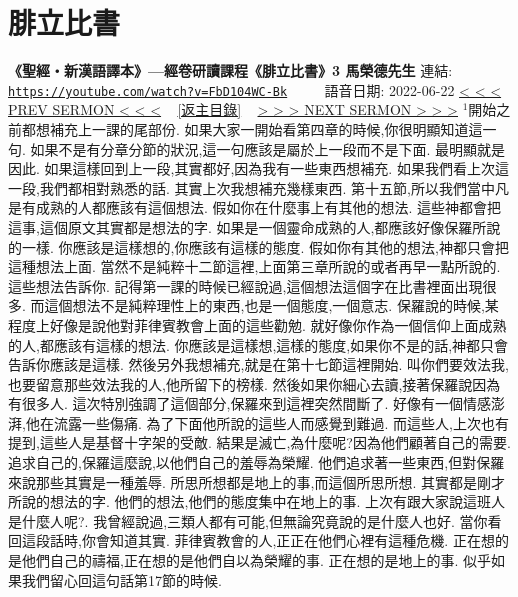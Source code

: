 \documentclass{book}
\begin{document}
\section{腓立比書}
\label{sec:FbD104WC_Bk}
\textbf{《聖經‧新漢語譯本》—經卷研讀課程《腓立比書》3 馬榮德先生}
\newline
\newline
連結: \href{https://youtube.com/watch?v=FbD104WC-Bk}{\texttt{https://youtube.com/watch?v=FbD104WC-Bk}} ~~~~ 語音日期: 2022-06-22
\newline
\newline
\hyperref[sec:fzMfZHATZ0U]{\small{< < < PREV SERMON < < <}}
~
\hyperref[sec:index]{\small{[返主目錄]}}
~
\hyperref[sec:ok3V257cOIA]{\small{> > > NEXT SERMON > > >}}
\newline
\newline
$^{1}$開始之前都想補充上一課的尾部份.
如果大家一開始看第四章的時候,你很明顯知道這一句.
如果不是有分章分節的狀況,這一句應該是屬於上一段而不是下面.
最明顯就是因此.
如果這樣回到上一段,其實都好,因為我有一些東西想補充.
如果我們看上次這一段,我們都相對熟悉的話.
其實上次我想補充幾樣東西.
第十五節,所以我們當中凡是有成熟的人都應該有這個想法.
假如你在什麼事上有其他的想法.
這些神都會把這事,這個原文其實都是想法的字.
如果是一個靈命成熟的人,都應該好像保羅所說的一樣.
你應該是這樣想的,你應該有這樣的態度.
假如你有其他的想法,神都只會把這種想法上面.
當然不是純粹十二節這裡,上面第三章所說的或者再早一點所說的.
這些想法告訴你.
記得第一課的時候已經說過,這個想法這個字在比書裡面出現很多.
而這個想法不是純粹理性上的東西,也是一個態度,一個意志.
保羅說的時候,某程度上好像是說他對菲律賓教會上面的這些勸勉.
就好像你作為一個信仰上面成熟的人,都應該有這樣的想法.
你應該是這樣想,這樣的態度,如果你不是的話,神都只會告訴你應該是這樣.
然後另外我想補充,就是在第十七節這裡開始.
叫你們要效法我,也要留意那些效法我的人,他所留下的榜樣.
然後如果你細心去讀,接著保羅說因為有很多人.
這次特別強調了這個部分,保羅來到這裡突然間斷了.
好像有一個情感澎湃,他在流露一些傷痛.
為了下面他所說的這些人而感覺到難過.
而這些人,上次也有提到,這些人是基督十字架的受敵.
結果是滅亡,為什麼呢?因為他們顧著自己的需要.
追求自己的,保羅這麼說,以他們自己的羞辱為榮耀.
他們追求著一些東西,但對保羅來說那些其實是一種羞辱.
所思所想都是地上的事,而這個所思所想.
其實都是剛才所說的想法的字.
他們的想法,他們的態度集中在地上的事.
上次有跟大家說這班人是什麼人呢?.
我曾經說過,三類人都有可能,但無論究竟說的是什麼人也好.
當你看回這段話時,你會知道其實.
菲律賓教會的人,正正在他們心裡有這種危機.
正在想的是他們自己的禱福,正在想的是他們自以為榮耀的事.
正在想的是地上的事.
似乎如果我們留心回這句話第17節的時候.
\end{document}
